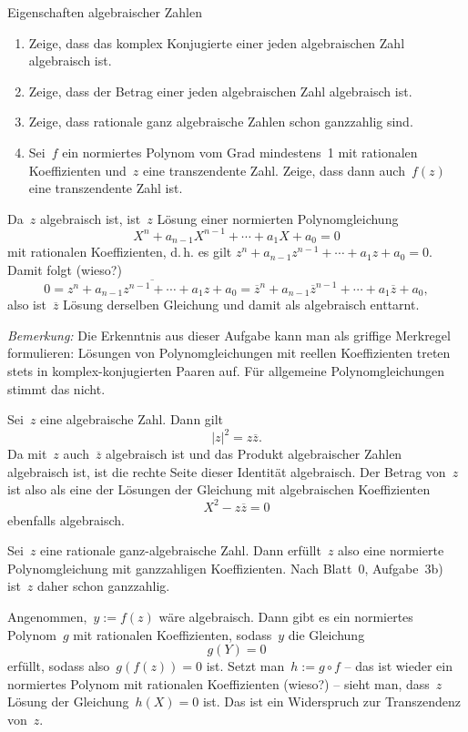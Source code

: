 \documentclass{algblatt}
\begin{document}
\ifloesungen\newpage\fi
\begin{aufgabe}{Eigenschaften algebraischer Zahlen}
\begin{enumerate}
\item Zeige, dass das komplex Konjugierte einer jeden algebraischen Zahl algebraisch
ist.
\item Zeige, dass der Betrag einer jeden algebraischen Zahl algebraisch ist.
\item Zeige, dass rationale ganz algebraische Zahlen schon ganzzahlig sind.
\item Sei~$f$ ein normiertes Polynom vom Grad mindestens~1 mit rationalen Koeffizienten
und~$z$ eine transzendente Zahl. Zeige, dass dann auch~$f(z)$ eine
transzendente Zahl ist.
\end{enumerate}
\begin{loesungE}
\item Da~$z$ algebraisch ist, ist~$z$ Lösung einer normierten Polynomgleichung
\[ X^n + a_{n-1} X^{n-1} + \cdots + a_1 X + a_0 = 0 \]
mit rationalen Koeffizienten, d.\,h. es gilt
$z^n + a_{n-1} z^{n-1} + \cdots + a_1 z + a_0 = 0$.
Damit folgt (wieso?)
\[ 0 = \overline{z^n + a_{n-1} z^{n-1} + \cdots + a_1 z + a_0} =
  \overline{z}^n + a_{n-1} \overline{z}^{n-1} + \cdots + a_1 \overline{z} + a_0, \]
also ist~$\overline{z}$ Lösung derselben Gleichung und damit als algebraisch
enttarnt.

\emph{Bemerkung:} Die Erkenntnis aus dieser Aufgabe kann man als griffige
Merkregel formulieren: Lösungen von Polynomgleichungen mit reellen
Koeffizienten treten stets in komplex-konjugierten Paaren auf. Für allgemeine
Polynomgleichungen stimmt das nicht.

\item Sei~$z$ eine algebraische Zahl. Dann gilt
\[ |z|^2 = z \overline{z}. \]
Da mit~$z$ auch~$\overline{z}$ algebraisch ist und das Produkt algebraischer
Zahlen algebraisch ist, ist die rechte Seite dieser Identität algebraisch. Der
Betrag von~$z$ ist also als eine der Lösungen der Gleichung mit algebraischen
Koeffizienten
\[ X^2 - z \overline{z} = 0 \]
ebenfalls algebraisch.
\item Sei~$z$ eine rationale ganz-algebraische Zahl. Dann erfüllt~$z$ also eine
normierte Polynomgleichung mit ganzzahligen Koeffizienten. Nach Blatt~0,
Aufgabe~3b) ist~$z$ daher schon ganzzahlig.
\item Angenommen,~$y := f(z)$ wäre algebraisch. Dann gibt es ein normiertes
Polynom~$g$ mit rationalen Koeffizienten, sodass~$y$ die Gleichung
\[ g(Y) = 0 \]
erfüllt, sodass also~$g(f(z)) = 0$ ist. Setzt man~$h := g \circ f$ -- das ist
wieder ein normiertes Polynom mit rationalen Koeffizienten (wieso?) -- sieht
man, dass~$z$ Lösung der Gleichung~$h(X) = 0$ ist. Das ist ein Widerspruch zur
Transzendenz von~$z$.


\end{loesungE}
\end{aufgabe}
\end{document}
